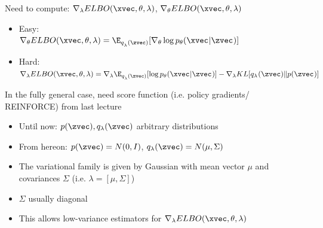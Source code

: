 \begin{frame}
  \begin{center}
   \end{center}   
Need to compute:
$\nabla_\lambda ELBO(\xvec, \theta, \lambda)$, $\nabla_\theta ELBO(\xvec, \theta, \lambda)$
\begin{itemize}
\item Easy: \\ $\nabla_\theta ELBO(\xvec, \theta, \lambda) =  \E_{q_\lambda^{}(\zvec)}[
\nabla_\theta \log  p_\theta(\xvec^{} | \zvec^{})] $ 
\item Hard: \\
$\nabla_\lambda ELBO(\xvec, \theta, \lambda) =  \nabla_\lambda \E_{q_\lambda^{}(\zvec)}[\log  p_\theta(\xvec^{} | \zvec^{})] - \nabla_\lambda KL[q_{\lambda^{}}(\zvec) \Vert p(\zvec^{})] $ 
\end{itemize}
In the fully general case, need score function (i.e. policy gradients/ REINFORCE) from last lecture
\end{frame}

\begin{frame}
  \begin{center}
   \end{center}
   \begin{itemize}
\item Until now: $p(\zvec), q_\lambda(\zvec)$ arbitrary distributions \\
\item From hereon: $p(\zvec) = N(0, I)$, $ q_\lambda(\zvec) = N(\mathbf{\mu}, \Sigma)$
\item The variational family is given by Gaussian with mean vector $\mu$ and covariances $\Sigma$ (i.e. $\lambda = [\mu, \Sigma]$)
\item $\Sigma$ usually diagonal
\item This allows  low-variance estimators for $\nabla_\lambda ELBO(\xvec, \theta, \lambda) $
\end{itemize}
\end{frame}

